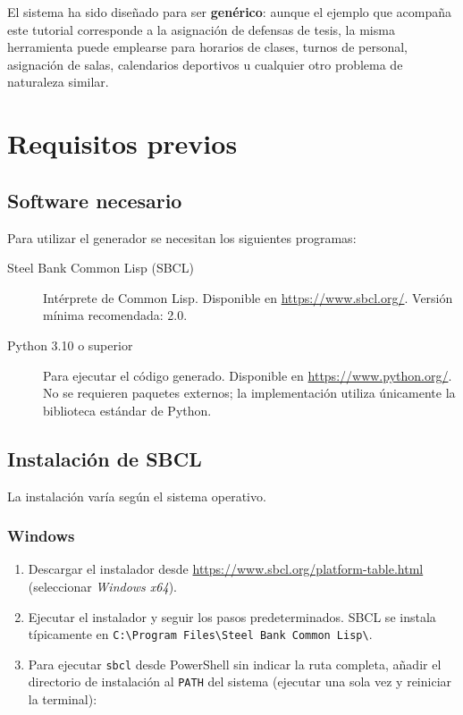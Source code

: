 \documentclass[12pt,a4paper]{article}
\newcommand{\code}[1]{\texttt{#1}}
\begin{document}
El sistema ha sido diseñado para ser \textbf{genérico}: aunque el ejemplo
que acompaña este tutorial corresponde a la asignación de defensas de
tesis, la misma herramienta puede emplearse para horarios de clases,
turnos de personal, asignación de salas, calendarios deportivos u
cualquier otro problema de naturaleza similar.

\section{Requisitos previos}
\label{sec:requisitos}

\subsection{Software necesario}

Para utilizar el generador se necesitan los siguientes programas:

\begin{description}
  \item[Steel Bank Common Lisp (SBCL)] Intérprete de Common Lisp.
    Disponible en \url{https://www.sbcl.org/}.
    Versión mínima recomendada: 2.0.

  \item[Python 3.10 o superior] Para ejecutar el código generado.
    Disponible en \url{https://www.python.org/}.
    No se requieren paquetes externos; la implementación utiliza
    únicamente la biblioteca estándar de Python.
\end{description}

\subsection{Instalación de SBCL}

La instalación varía según el sistema operativo.

\subsubsection*{Windows}

\begin{enumerate}
  \item Descargar el instalador desde \url{https://www.sbcl.org/platform-table.html}
        (seleccionar \textit{Windows x64}).
  \item Ejecutar el instalador y seguir los pasos predeterminados.
        SBCL se instala típicamente en
        \code{C:\textbackslash Program Files\textbackslash Steel Bank Common Lisp\textbackslash}.
  \item Para ejecutar \code{sbcl} desde PowerShell sin indicar la ruta completa,
        añadir el directorio de instalación al \code{PATH} del sistema
        (ejecutar una sola vez y reiniciar la terminal):
\end{enumerate}
\end{document}
